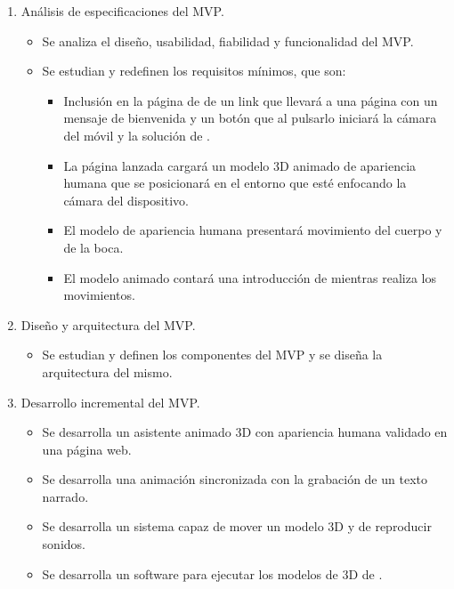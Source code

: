 \documentclass{subfiles}
\begin{document}
\begin{enumerate}
            \begin{enumerate}
                \item Análisis de especificaciones del MVP.
                \begin{itemize}
                    \item Se analiza el diseño, usabilidad, fiabilidad y funcionalidad del MVP.
                    \item Se estudian y redefinen los requisitos mínimos, que son:
                    \begin{itemize}
                        \item Inclusión en la página de \silverstorm de un link que llevará a una página con un mensaje de bienvenida y un botón que al pulsarlo iniciará la cámara del móvil y la solución de \ra.
                        \item La página lanzada cargará un modelo 3D animado de apariencia humana que se posicionará en el entorno que esté enfocando la cámara del dispositivo.
                        \item El modelo de apariencia humana presentará movimiento del cuerpo y de la boca.
                        \item El modelo animado contará una introducción de \silverstorm mientras realiza los movimientos.
                    \end{itemize}
                \end{itemize}
                
                \item Diseño y arquitectura del MVP.
                \begin{itemize}
                    \item Se estudian y definen los componentes del MVP y se diseña la arquitectura del mismo.
                \end{itemize}
                
                \item Desarrollo incremental del MVP.
                \begin{itemize}
                    \item Se desarrolla un asistente animado 3D con apariencia humana validado en una página web.
                    \item Se desarrolla una animación sincronizada con la grabación de un texto narrado.
                    \item Se desarrolla un sistema capaz de mover un modelo 3D y de reproducir sonidos.
                    \item Se desarrolla un software para ejecutar los modelos de 3D de \ra.
                \end{itemize}
                

\end{enumerate}
\end{enumerate}
\end{document}

